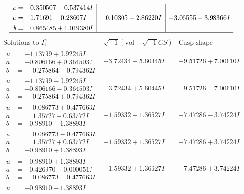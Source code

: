 \documentclass[1p]{elsarticle_modified}
\theoremstyle{definition}
\newcommand{\I}{\sqrt{-1}}
\begin{document}
$$\begin{array}{c|c|c}
\begin{aligned}
u &= -0.350507 - 0.537414 I \\
a &= -1.71691 + 0.28607 I \\
b &= \phantom{-}0.865485 + 1.019380 I\end{aligned}
 & \phantom{-}0.10305 + 2.86220 I & -3.06555 - 3.98366 I\\
 \hline 
 \end{array}$$\newpage$$\begin{array}{c|c|c}  
\text{Solutions to }I^u_{3}& \I (\text{vol} + \sqrt{-1}CS) & \text{Cusp shape}\\
 \hline 
\begin{aligned}
u &= -1.13799 + 0.92245 I \\
a &= -0.806166 + 0.364503 I \\
b &= \phantom{-}0.275864 - 0.794362 I\end{aligned}
 & -3.72434 - 5.60445 I & -9.51726 + 7.00610 I \\ \hline\begin{aligned}
u &= -1.13799 - 0.92245 I \\
a &= -0.806166 - 0.364503 I \\
b &= \phantom{-}0.275864 + 0.794362 I\end{aligned}
 & -3.72434 + 5.60445 I & -9.51726 - 7.00610 I \\ \hline\begin{aligned}
u &= \phantom{-}0.086773 + 0.477663 I \\
a &= \phantom{-}1.35727 - 0.63772 I \\
b &= -0.98910 - 1.38893 I\end{aligned}
 & -1.59332 - 1.36627 I & -7.47286 - 3.74224 I \\ \hline\begin{aligned}
u &= \phantom{-}0.086773 - 0.477663 I \\
a &= \phantom{-}1.35727 + 0.63772 I \\
b &= -0.98910 + 1.38893 I\end{aligned}
 & -1.59332 + 1.36627 I & -7.47286 + 3.74224 I \\ \hline\begin{aligned}
u &= -0.98910 + 1.38893 I \\
a &= -0.426970 - 0.000051 I \\
b &= \phantom{-}0.086773 - 0.477663 I\end{aligned}
 & -1.59332 + 1.36627 I & -7.47286 + 3.74224 I \\ \hline\begin{aligned}
u &= -0.98910 - 1.38893 I \\

\end{aligned}
\end{array}$$
\end{document}
